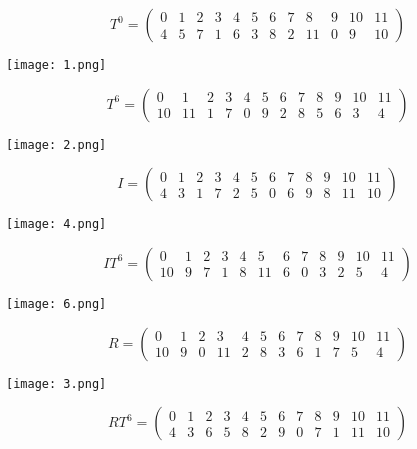 $$
{T}^0=\left(
\begin{array}{cccccccccccc}
0  & 1  &  2  & 3  & 4   & 5  &  6   & 7  & 8  & 9   & 10  & 11  \\
4& 5& 7& 1& 6& 3& 8& 2& 11& 0& 9& 10
\end{array}
\right)
$$
	\begin{center}
		\texttt{[image: 1.png]}
	\end{center}
	\bigskip\bigskip
$$
{T}^6=\left(
\begin{array}{cccccccccccc}
0  & 1  &  2  & 3  & 4   & 5  &  6   & 7  & 8  & 9   & 10  & 11  \\
10& 11& 1& 7& 0& 9& 2& 8& 5& 6& 3& 4
\end{array}
\right)
$$
	\begin{center}
		\texttt{[image: 2.png]}
	\end{center}
	\bigskip\bigskip
$$
I=\left(
\begin{array}{cccccccccccc}
0  & 1  &  2  & 3  & 4   & 5  &  6   & 7  & 8  & 9   & 10  & 11  \\
4& 3& 1& 7& 2& 5& 0& 6& 9& 8& 11& 10
\end{array}
\right)
$$
	\begin{center}
		\texttt{[image: 4.png]}
	\end{center}
	\bigskip\bigskip
$$
{IT}^6=\left(
\begin{array}{cccccccccccc}
0  & 1  &  2  & 3  & 4   & 5  &  6   & 7  & 8  & 9   & 10  & 11  \\
10& 9& 7& 1& 8& 11& 6& 0& 3& 2& 5& 4
\end{array}
\right)
$$
	\begin{center}
		\texttt{[image: 6.png]}
	\end{center}
	\bigskip\bigskip
$$
R=\left(
\begin{array}{cccccccccccc}
0  & 1  &  2  & 3  & 4   & 5  &  6   & 7  & 8  & 9   & 10  & 11  \\
10& 9& 0& 11& 2& 8& 3& 6& 1& 7& 5& 4
\end{array}
\right)
$$
	\begin{center}
		\texttt{[image: 3.png]}
	\end{center}
	\bigskip\bigskip
$$
{RT}^6=\left(
\begin{array}{cccccccccccc}
0  & 1  &  2  & 3  & 4   & 5  &  6   & 7  & 8  & 9   & 10  & 11  \\
4& 3& 6& 5& 8& 2& 9& 0& 7& 1& 11& 10
\end{array}
\right)
$$
